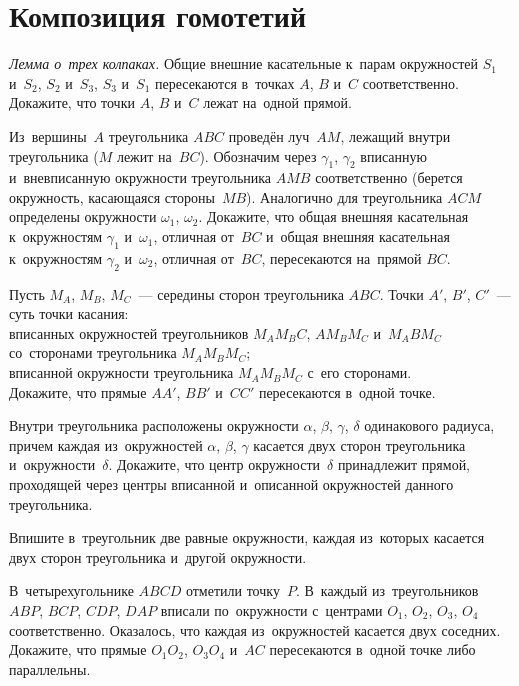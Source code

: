 
\section*{Композиция гомотетий}


\begin{problems}

\item\emph{Лемма о~трех колпаках.}
Общие внешние касательные к~парам окружностей $S_1$ и~$S_2$, $S_2$ и~$S_3$,
$S_3$ и~$S_1$ пересекаются в~точках $A$, $B$ и~$C$ соответственно.
Докажите, что точки $A$, $B$ и~$C$ лежат на~одной прямой.

\item
Из~вершины~$A$ треугольника $ABC$ проведён луч~$AM$, лежащий внутри
треугольника ($M$ лежит на~$BC$).
Обозначим через $\gamma_1$, $\gamma_2$ вписанную и~вневписанную окружности
треугольника $AMB$ соответственно (берется окружность, касающаяся
стороны~$MB$).
Аналогично для треугольника $ACM$ определены окружности $\omega_1$, $\omega_2$.
Докажите, что общая внешняя касательная к~окружностям $\gamma_1$ и~$\omega_1$,
отличная от~$BC$ и~общая внешняя касательная к~окружностям $\gamma_2$ и~$\omega_2$, отличная от~$BC$, пересекаются на~прямой $BC$.

\item
Пусть $M_A$, $M_B$, $M_C$~--- середины сторон треугольника $ABC$.
Точки $A'$, $B'$, $C'$~--- суть точки касания:
\\
\sp
вписанных окружностей треугольников $M_A M_B C$, $A M_B M_C$ и~$M_A B M_C$
со~сторонами треугольника $M_A M_B M_C$;
\\
\sp
вписанной окружности треугольника $M_A M_B M_C$ с~его сторонами.
\\
Докажите, что прямые $AA'$, $BB'$ и~$CC'$ пересекаются в~одной точке.

\item
Внутри треугольника расположены окружности
$\alpha$, $\beta$, $\gamma$, $\delta$ одинакового радиуса, причем каждая
из~окружностей $\alpha$, $\beta$, $\gamma$ касается двух сторон треугольника
и~окружности~$\delta $.
Докажите, что центр окружности~$\delta$ принадлежит прямой, проходящей через
центры вписанной и~описанной окружностей данного треугольника.

\item
Впишите в~треугольник две равные окружности, каждая из~которых касается двух
сторон треугольника и~другой окружности.

\item
В~четырехугольнике $ABCD$ отметили точку~$P$.
В~каждый из~треугольников $ABP$, $BCP$, $CDP$, $DAP$ вписали по~окружности
с~центрами $O_1$, $O_2$, $O_3$, $O_4$ соответственно.
Оказалось, что каждая из~окружностей касается двух соседних.
Докажите, что прямые $O_1 O_2$, $O_3 O_4$ и~$AC$ пересекаются в~одной точке
либо параллельны.

\end{problems}

